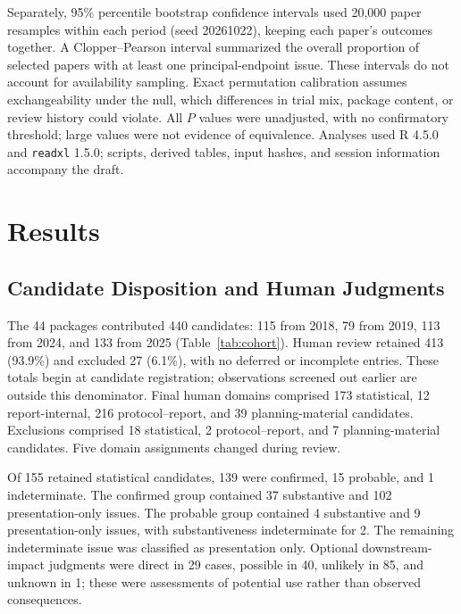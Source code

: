 \documentclass[12pt,a4paper]{article}
\begin{document}
Separately, 95\% percentile bootstrap confidence intervals used 20,000 paper resamples within each period (seed 20261022), keeping each paper's outcomes together. A Clopper--Pearson interval summarized the overall proportion of selected papers with at least one principal-endpoint issue. These intervals do not account for availability sampling. Exact permutation calibration assumes exchangeability under the null, which differences in trial mix, package content, or review history could violate. All \(P\) values were unadjusted, with no confirmatory threshold; large values were not evidence of equivalence. Analyses used R 4.5.0 and \texttt{readxl} 1.5.0; scripts, derived tables, input hashes, and session information accompany the draft.



\section{Results}
\label{sec:results}

\subsection{Candidate Disposition and Human Judgments}

The 44 packages contributed 440 candidates: 115 from 2018, 79 from 2019, 113 from 2024, and 133 from 2025 (Table~\ref{tab:cohort}). Human review retained 413 (93.9\%) and excluded 27 (6.1\%), with no deferred or incomplete entries. These totals begin at candidate registration; observations screened out earlier are outside this denominator. Final human domains comprised 173 statistical, 12 report-internal, 216 protocol--report, and 39 planning-material candidates. Exclusions comprised 18 statistical, 2 protocol--report, and 7 planning-material candidates. Five domain assignments changed during review.

Of 155 retained statistical candidates, 139 were confirmed, 15 probable, and 1 indeterminate. The confirmed group contained 37 substantive and 102 presentation-only issues. The probable group contained 4 substantive and 9 presentation-only issues, with substantiveness indeterminate for 2. The remaining indeterminate issue was classified as presentation only. Optional downstream-impact judgments were direct in 29 cases, possible in 40, unlikely in 85, and unknown in 1; these were assessments of potential use rather than observed consequences.
\end{document}
